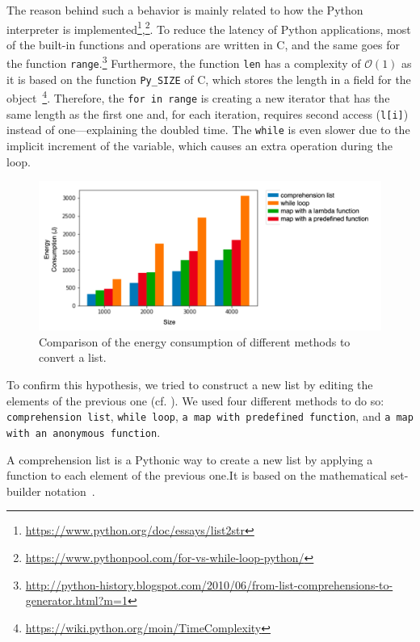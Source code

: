 The reason behind such a behavior is mainly related to how the Python interpreter is implemented\footnote{\url{https://www.python.org/doc/essays/list2str}},\footnote{\url{https://www.pythonpool.com/for-vs-while-loop-python/}}.
To reduce the latency of Python applications, most of the built-in functions and operations are written in C, and the same goes for the function \texttt{range}.\footnote{\url{ http://python-history.blogspot.com/2010/06/from-list-comprehensions-to-generator.html?m=1}}
Furthermore, the function \texttt{len} has a complexity of $\mathcal{O}(1)$ as it is based on the function \texttt{Py\_SIZE} of C, which stores the length in a field for the object~\footnote{\url{https://wiki.python.org/moin/TimeComplexity}}.
Therefore, the \texttt{for in range} is creating a new iterator that has the same length as the first one and, for each iteration, requires second access (\texttt{l[i]}) instead of one---explaining the doubled time.
The \texttt{while} is even slower due to the implicit increment of the variable, which causes an extra operation during the loop.

\begin{figure}
    \centering
    \includegraphics[width=\linewidth]{imgs/python_treatemens}
    \caption{Comparison of the energy consumption of different methods to convert a list.}
    \label{fig:pythontreatement}
\end{figure}


To confirm this hypothesis, we tried to construct a new list by editing the elements of the previous one (cf. ).
We used four different methods to do so: \texttt{comprehension list}, \texttt{while loop}, \texttt{a map with predefined function}, and \texttt{a map with an anonymous function}.

A comprehension list is a Pythonic way to create a new list by applying a function to each element of the previous one.It is based on the mathematical set-builder notation~\cite{editiondiscrete}.

